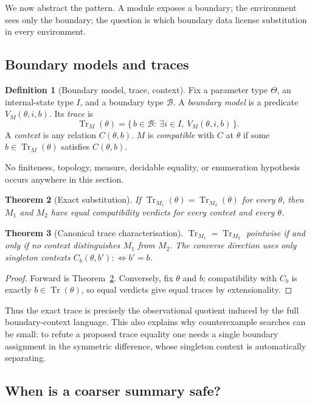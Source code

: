 \documentclass[11pt,a4paper]{article}
\theoremstyle{plain}
\newtheorem{theorem}{Theorem}[section]
\theoremstyle{definition}
\newtheorem{definition}[theorem]{Definition}
\theoremstyle{remark}
\newcommand{\Tr}{\operatorname{Tr}}
\begin{document}
We now abstract the pattern. A module exposes a boundary; the environment sees only the boundary; the question is which boundary data license substitution in every environment.

\subsection{Boundary models and traces}

\begin{definition}[Boundary model, trace, context]
Fix a parameter type $\Theta$, an internal-state type $I$, and a boundary type $\mathcal B$. A \emph{boundary model} is a predicate $V_M(\theta,i,b)$. Its \emph{trace} is
\[
\Tr_M(\theta)=\{\,b\in\mathcal B:\ \exists i\in I,\ V_M(\theta,i,b)\,\}.
\]
A \emph{context} is any relation $C(\theta,b)$. $M$ is \emph{compatible} with $C$ at $\theta$ if some $b\in\Tr_M(\theta)$ satisfies $C(\theta,b)$.
\end{definition}

No finiteness, topology, measure, decidable equality, or enumeration hypothesis occurs anywhere in this section.

\begin{theorem}[Exact substitution]\label{thm:subst}
If $\Tr_{M_1}(\theta)=\Tr_{M_2}(\theta)$ for every $\theta$, then $M_1$ and $M_2$ have equal compatibility verdicts for every context and every $\theta$.
\end{theorem}

\begin{theorem}[Canonical trace characterisation]\label{thm:canonical}
$\Tr_{M_1}=\Tr_{M_2}$ pointwise if and only if no context distinguishes $M_1$ from $M_2$. The converse direction uses only singleton contexts $C_b(\theta,b'):\Leftrightarrow b'=b$.
\end{theorem}
\begin{proof}
Forward is Theorem~\ref{thm:subst}. Conversely, fix $\theta$ and $b$; compatibility with $C_b$ is exactly $b\in\Tr(\theta)$, so equal verdicts give equal traces by extensionality.
\end{proof}

Thus the exact trace is precisely the observational quotient induced by the full boundary-context language. This also explains why counterexample searches can be small: to refute a proposed trace equality one needs a single boundary assignment in the symmetric difference, whose singleton context is automatically separating.

\subsection{When is a coarser summary safe?}
\end{document}
